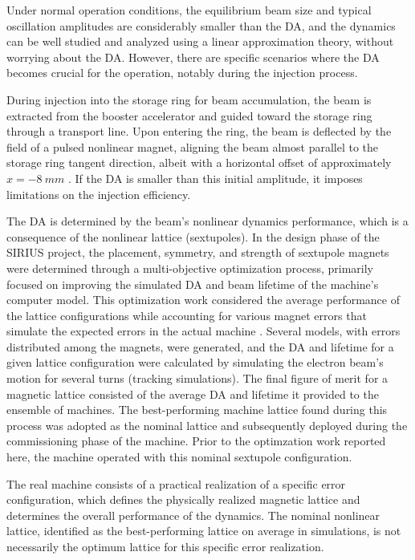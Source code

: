 Under normal operation conditions, the equilibrium beam size and typical oscillation amplitudes are considerably smaller than the DA, and the dynamics can be well studied and analyzed using a linear approximation theory, without worrying about the DA. However, there are specific scenarios where the DA becomes crucial for the operation, notably during the injection process.

During injection into the storage ring for beam accumulation, the beam is extracted from the booster accelerator and guided toward the storage ring through a transport line. Upon entering the ring, the beam is deflected by the field of a pulsed nonlinear magnet, aligning the beam almost parallel to the storage ring tangent direction, albeit with a horizontal offset of approximately $x=-8~\unit{mm}$ \cite{liu_injection_2016}. If the DA is smaller than this initial amplitude, it imposes limitations on the injection efficiency.

The DA is determined by the beam's nonlinear dynamics performance, which is a consequence of the nonlinear lattice (sextupoles). In the design phase of the SIRIUS project, the placement, symmetry, and strength of sextupole magnets were determined through a multi-objective optimization process, primarily focused on improving the simulated DA and beam lifetime of the machine's computer model\cite{de_sa_optimization_2016, dester_energy_2017}. This optimization work considered the average performance of the lattice configurations while accounting for various magnet errors that simulate the expected errors in the actual machine \cite{de_sa_optimization_2016}. Several models, with errors distributed among the magnets, were generated, and the DA and lifetime for a given lattice configuration were calculated by simulating the electron beam's motion for several turns (tracking simulations). The final figure of merit for a magnetic lattice consisted of the average DA and lifetime it provided to the ensemble of machines. The best-performing machine lattice found during this process was adopted as the nominal lattice and subsequently deployed during the commissioning phase of the machine. Prior to the optimzation work reported here, the machine operated with this nominal sextupole configuration.

The real machine consists of a practical realization of a specific error configuration, which defines the physically realized magnetic lattice and determines the overall performance of the dynamics. The nominal nonlinear lattice, identified as the best-performing lattice on average in simulations, is not necessarily the optimum lattice for this specific error realization.

